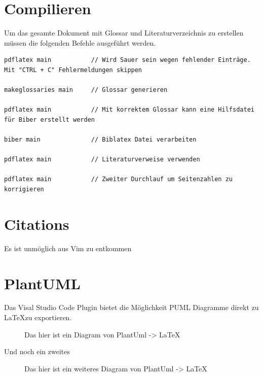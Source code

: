 \section{Compilieren}
Um das gesamte Dokument mit Glossar und Literaturverzeichnis zu erstellen müssen die folgenden Befehle ausgeführt werden.

\begin{lstlisting}[caption=Compilieren des Dokuments, label=CompileInstructions]
pdflatex main           // Wird Sauer sein wegen fehlender Einträge. Mit "CTRL + C" Fehlermeldungen skippen

makeglossaries main     // Glossar generieren

pdflatex main           // Mit korrektem Glossar kann eine Hilfsdatei für Biber erstellt werden

biber main              // Biblatex Datei verarbeiten

pdflatex main           // Literaturverweise verwenden

pdflatex main           // Zweiter Durchlauf um Seitenzahlen zu korrigieren
\end{lstlisting}

\section{Citations}
Es ist unmöglich aus Vim zu entkommen \cite{nerd_how_2012}

\section{PlantUML}
Das Visal Studio Code Plugin bietet die Möglichkeit PUML Diagramme direkt zu \LaTeX zu exportieren.

\begin{figure}[H]
    \centering
    
    \caption{Das hier ist ein Diagram von PlantUml -> \LaTeX}
\end{figure}

Und noch ein zweites
\begin{figure}[H]
    \begin{center}
        
    \end{center}
    \caption{Das hier ist ein weiteres Diagram von PlantUml -> \LaTeX}
\end{figure}